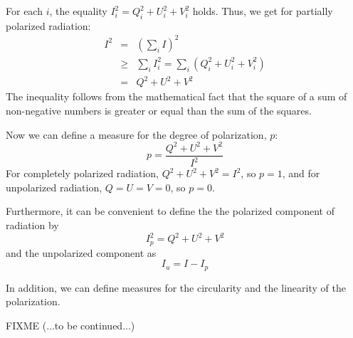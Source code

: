 For each $i$, the equality $I_i^2 = Q_i^2 + U_i^2 + V_i^2$
holds. Thus, we get for partially polarized radiation:
\begin{eqnarray}
  I^2 &=& \left(\sum_i I\right)^2\\ \nonumber
      &\geq& \sum_i I_i^2 = \sum_i (Q_i^2  + U_i^2 + V_i^2)\\ \nonumber
      &=& Q^2 + U^2 + V^2
  \label{eq:polarization:stokes_inequality}
\end{eqnarray}
The inequality follows from  the mathematical fact that the square of
a sum of non-negative numbers is greater or equal than the sum of the
squares. 

Now we can define a measure for the degree of polarization, $p$:
\begin{equation}
  \label{eq:polarization:pol_degree}
  p = \frac{Q^2 + U^2 + V^2}{I^2}
\end{equation}
For completely polarized radiation, $Q^2 + U^2 + V^2 = I^2$, so $p =
1$, and for unpolarized radiation, $Q = U = V = 0$, so $p = 0$.

Furthermore, it can be convenient to define the the polarized
component of radiation by
\begin{equation}
  \label{eq:polarization:pol_compoent}
  I_p^2 = Q^2 + U^2 + V^2
\end{equation}
and the unpolarized component as
\begin{equation}
  \label{eq:polarization:unpol_compoent}
  I_u = I - I_p
\end{equation}

In addition, we can define measures for the circularity and the
linearity of the polarization.

FIXME (...to be continued...)


